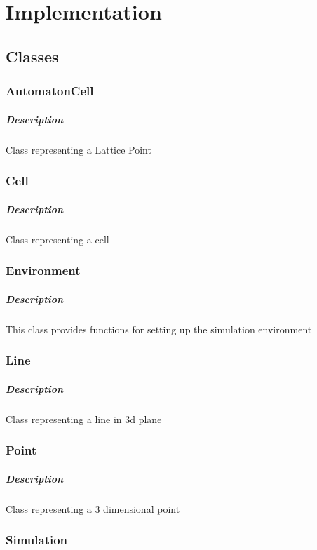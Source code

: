 \documentclass[11pt]{report}
\begin{document}
  \chapter{Implementation}
  \section{\color{red}Classes}
  \subsection{\color{blue}AutomatonCell}
  \paragraph{Description}
  Class representing a Lattice Point
  \subsection{\color{blue}Cell}
  \paragraph{Description}
  Class representing a cell
  \subsection{\color{blue}Environment}
  \paragraph{Description}
  This class provides functions for setting up the simulation environment
  \subsection{\color{blue}Line}
  \paragraph{Description}
  Class representing a line in 3d plane
  \subsection{\color{blue}Point}
  \paragraph{Description}
  Class representing a 3 dimensional point
  \subsection{\color{blue}Simulation}
\end{document}
